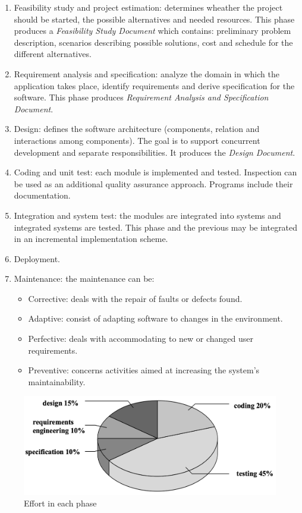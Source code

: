 \documentclass[12pt, a4paper]{report}
\theoremstyle{remark}
\begin{document}
    \begin{enumerate}
        \item Feasibility study and project estimation: determines wheather the project should be started, the possible 
        alternatives and needed resources. This phase produces a \emph{Feasibility Study Document} which contains: preliminary 
        problem description, scenarios describing possible solutions, cost and schedule for the different alternatives.
        \item Requirement analysis and specification: analyze the domain in which the application takes place, identify requirements 
        and derive specification for the software. This phase produces \emph{Requirement Analysis and Specification Document}.
        \item Design: defines the software architecture (components, relation and interactions among components). The goal is to support
        concurrent development and separate responsibilities. It produces the \emph{Design Document}.
        \item Coding and unit test: each module is implemented and tested. Inspection can be used as an additional quality assurance 
        approach. Programs include their documentation. 
        \item Integration and system test: the modules are integrated into systems and integrated systems are tested. This phase 
        and the previous may be integrated in an incremental implementation scheme. 
        \item Deployment.
        \item Maintenance: the maintenance can be:
        \begin{itemize}
            \item Corrective: deals with the repair of faults or defects found.
            \item Adaptive: consist of adapting software to changes in the environment.
            \item Perfective: deals with accommodating to new or changed user requirements.
            \item Preventive: concerns activities aimed at increasing the system's maintainability. 
        \end{itemize}
    \end{enumerate}
    \begin{figure}
        \centering
        \includegraphics[width=1\linewidth]{images/effort.png}
        \caption{Effort in each phase}
    \end{figure}
\end{document}
